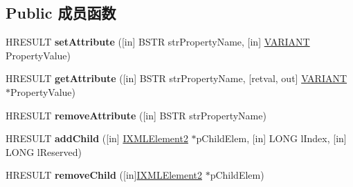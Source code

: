 \subsection*{Public 成员函数}
\begin{DoxyCompactItemize}
\item 
\mbox{\label{interface_m_s_x_m_l_1_1_i_x_m_l_element2_a4e1fd113ad7e614a905e41a4620614ea}} 
H\+R\+E\+S\+U\+LT {\bfseries set\+Attribute} (\mbox{[}in\mbox{]} B\+S\+TR str\+Property\+Name, \mbox{[}in\mbox{]} \hyperlink{structtag_v_a_r_i_a_n_t}{V\+A\+R\+I\+A\+NT} Property\+Value)
\item 
\mbox{\label{interface_m_s_x_m_l_1_1_i_x_m_l_element2_a60dd531ab6d423ce40679e6b7bb68a45}} 
H\+R\+E\+S\+U\+LT {\bfseries get\+Attribute} (\mbox{[}in\mbox{]} B\+S\+TR str\+Property\+Name, \mbox{[}retval, out\mbox{]} \hyperlink{structtag_v_a_r_i_a_n_t}{V\+A\+R\+I\+A\+NT} $\ast$Property\+Value)
\item 
\mbox{\label{interface_m_s_x_m_l_1_1_i_x_m_l_element2_a4e0d012cb8bd47e6c9d1a564f08a37b3}} 
H\+R\+E\+S\+U\+LT {\bfseries remove\+Attribute} (\mbox{[}in\mbox{]} B\+S\+TR str\+Property\+Name)
\item 
\mbox{\label{interface_m_s_x_m_l_1_1_i_x_m_l_element2_a8df8e801830d23652f8f74cecc69e86d}} 
H\+R\+E\+S\+U\+LT {\bfseries add\+Child} (\mbox{[}in\mbox{]} \hyperlink{interface_m_s_x_m_l_1_1_i_x_m_l_element2}{I\+X\+M\+L\+Element2} $\ast$p\+Child\+Elem, \mbox{[}in\mbox{]} L\+O\+NG l\+Index, \mbox{[}in\mbox{]} L\+O\+NG l\+Reserved)
\item 
\mbox{\label{interface_m_s_x_m_l_1_1_i_x_m_l_element2_a2883620f81211f96d496006c1ffc3f83}} 
H\+R\+E\+S\+U\+LT {\bfseries remove\+Child} (\mbox{[}in\mbox{]}\hyperlink{interface_m_s_x_m_l_1_1_i_x_m_l_element2}{I\+X\+M\+L\+Element2} $\ast$p\+Child\+Elem)
\end{DoxyCompactItemize}
